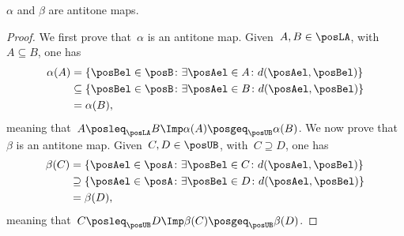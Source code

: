 \begin{lemma}
  \label{lem:alfabetaantitone}
  $\alpha$ and $\beta$ are antitone maps.
\end{lemma}
\begin{proof}
  We first prove that~$\alpha$ is an antitone map. Given~$A,B\in \posLA$, with~$A\subseteq B$, one has
  \begin{equation}
    \begin{aligned}
      \alpha(A)&=\{ \posBel\in \posB \colon \exists \posAel\in A\colon d(\posAel,\posBel)\}\\
      &\subseteq \{\posBel\in \posB \colon \exists \posAel\in B\colon d(\posAel,\posBel)\}\\
      &=\alpha(B),
    \end{aligned}
  \end{equation}
  meaning that~$A\posleq_{\posLA} B\Imp \alpha(A) \posgeq_{\posUB} \alpha(B)$.
  We now prove that~$\beta$ is an antitone map. Given~$C,D\in \posUB$, with~$C\supseteq D$, one has
  \begin{equation}
    \begin{aligned}
      \beta(C)&=\{\posAel\in \posA\colon \exists \posBel\in C\colon d(\posAel,\posBel)\}\\
      &\supseteq \{\posAel\in \posA\colon \exists \posBel\in D \colon d(\posAel,\posBel)\}\\
      &=\beta(D),
    \end{aligned}
  \end{equation}
  meaning that~$C\posleq_{\posUB} D \Imp \beta(C)\posgeq_{\posUB} \beta(D)$.
\end{proof}



